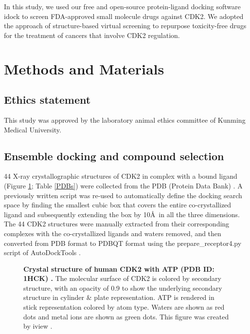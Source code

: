 \documentclass[10pt,letterpaper]{article}
\begin{document}
In this study, we used our free and open-source protein-ligand docking software idock \cite{1153,1362} to screen FDA-approved small molecule drugs against CDK2. We adopted the approach of structure-based virtual screening to repurpose toxicity-free drugs for the treatment of cancers that involve CDK2 regulation.

\section*{Methods and Materials}

\subsection*{Ethics statement}

This study was approved by the laboratory animal ethics committee of Kunming Medical University.

\subsection*{Ensemble docking and compound selection}

44 X-ray crystallographic structures of CDK2 in complex with a bound ligand (Figure \ref{1HCK}; Table \ref{PDBs}) were collected from the PDB (Protein Data Bank) \cite{540,537}. A previously written script \cite{1362} was re-used to automatically define the docking search space by finding the smallest cubic box that covers the entire co-crystallized ligand and subsequently extending the box by 10\AA\ in all the three dimensions. The 44 CDK2 structures were manually extracted from their corresponding complexes with the co-crystallized ligands and waters removed, and then converted from PDB format to PDBQT format using the prepare\_receptor4.py script of AutoDockTools \cite{596}.

\begin{figure}
\caption{{\bf Crystal structure of human CDK2 with ATP (PDB ID: 1HCK) \cite{1142}.}
The molecular surface of CDK2 is colored by secondary structure, with an opacity of 0.9 to show the underlying secondary structure in cylinder \& plate representation. ATP is rendered in stick representation colored by atom type. Waters are shown as red dots and metal ions are shown as green dots. This figure was created by iview \cite{1366}.}
\label{1HCK}
\end{figure}
\end{document}
